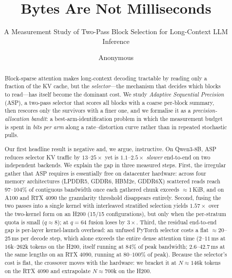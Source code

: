 \documentclass[sigconf,nonacm,11pt]{acmart}
\begin{document}
\title{Bytes Are Not Milliseconds}
\subtitle{A Measurement Study of Two-Pass Block Selection for Long-Context LLM Inference}

\author{Anonymous}
\affiliation{\institution{}\country{}}

\begin{abstract}
Block-sparse attention makes long-context decoding tractable by reading only a
fraction of the KV cache, but the \emph{selector}---the mechanism that decides
which blocks to read---has itself become the dominant cost. We study
\emph{Adaptive Sequential Precision} (ASP), a two-pass selector that scores all
blocks with a coarse per-block summary, then rescores only the survivors with a
finer one, and we formalise it as a \emph{precision-allocation bandit}: a
best-arm-identification problem in which the measurement budget is spent in
\emph{bits per arm} along a rate--distortion curve rather than in repeated
stochastic pulls.

Our first headline result is negative and, we argue, instructive. On Qwen3-8B, ASP
reduces selector KV traffic by $13\text{--}25\times$ yet is $1.1\text{--}2.5\times$
\emph{slower} end-to-end on two independent backends. We explain the gap in three measured steps. First, the
irregular gather that ASP requires is essentially free on datacenter hardware:
across four memory architectures (LPDDR5, GDDR6, HBM2e, GDDR6X) scattered reads
reach $97\text{--}104\%$ of contiguous bandwidth once each gathered chunk exceeds
$\approx$1\,KiB, and on A100 and RTX 4090 the granularity threshold disappears
entirely.
Second, fusing the two passes into a single kernel with interleaved stratified
selection yields $1.57\times$ over the two-kernel form on an H200 (15/15
configurations), but only when the per-stratum quota is small ($q\!\approx\!8$);
at $q=64$ fusion loses by $3\times$. Third, the residual end-to-end gap is
per-layer kernel-launch overhead: an unfused PyTorch selector costs a flat
$\approx$20--25\,ms per decode step, which alone exceeds the entire dense attention
time ($2\text{--}11$\,ms at $16$k--$262$k tokens on the H200, itself running at
$84\%$ of peak bandwidth; $2.6\text{--}42.7$\,ms at the same lengths on an
RTX 4090, running at $80\text{--}100\%$ of peak). Because the selector's cost is
flat, the crossover moves with the hardware: we bracket it at $N\approx146$k
tokens on the RTX 4090 and extrapolate $N\approx700$k on the H200.


\end{abstract}
\end{document}
